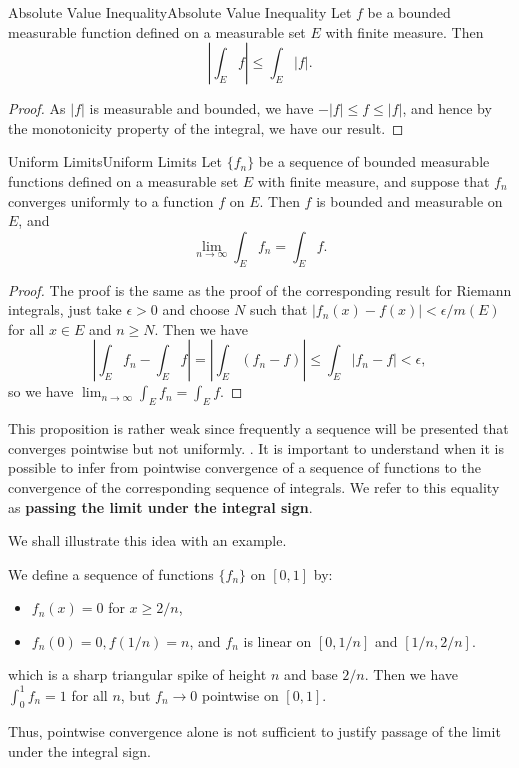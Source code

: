 \documentclass[../main.tex]{subfiles}
\begin{document}
\begin{proposition}{Absolute Value Inequality}{Absolute Value Inequality}
	Let $f$ be a bounded measurable function defined on a measurable set $E$ with finite measure. Then
	\begin{equation}
		\left| \int_E f \right| \leq \int_E |f|.
	\end{equation}
\end{proposition}
\begin{proof}
	As $|f|$ is measurable and bounded, we have $-|f| \leq f \leq |f|$, and hence by the monotonicity property of the integral, we have our result.
\end{proof}

\begin{proposition}{Uniform Limits}{Uniform Limits}
	Let $\{ f_n \}$ be a sequence of bounded measurable functions defined on a measurable set $E$ with finite measure, and suppose that $f_n$ converges uniformly to a function $f$ on $E$. Then $f$ is bounded and measurable on $E$, and
	\begin{equation}
		\lim_{n \to \infty} \int_E f_n = \int_E f.
	\end{equation}
\end{proposition}
\begin{proof}
	The proof is the same as the proof of the corresponding result for Riemann integrals, just take $\epsilon > 0$ and choose $N$ such that $|f_n(x) - f(x)| < \epsilon / m(E)$ for all $x \in E$ and $n \geq N$. Then we have
	\begin{equation*}
		\left| \int_E f_n - \int_E f \right| = \left| \int_E (f_n - f) \right| \leq \int_E |f_n - f| < \epsilon,
	\end{equation*}
	so we have $\lim_{n \to \infty} \int_E f_n = \int_E f$.
\end{proof}

This proposition is rather weak since frequently a sequence will be presented that converges pointwise but not uniformly. . It is important to understand when it is possible to infer from pointwise convergence of a sequence of functions to the convergence of the corresponding sequence of integrals. We refer to this equality as \textbf{passing the limit under the integral sign}.

We shall illustrate this idea with an example.

\begin{example}{}{}
	We define a sequence of functions $\{ f_n \}$ on $[0, 1]$ by:
	\begin{itemize}
		\item $f_n(x) = 0$ for $x \geq 2/n$,
		\item $f_n(0) = 0, f(1/n) = n$, and $f_n$ is linear on $[0, 1/n]$ and $[1/n, 2/n]$.
	\end{itemize}
	which is a sharp triangular spike of height $n$ and base $2/n$. Then we have $\int_0^1 f_n = 1$ for all $n$, but $f_n \to 0$ pointwise on $[0, 1]$.

	Thus, pointwise convergence alone is not sufficient to justify passage of the limit under the integral sign.
\end{example}
\end{document}
